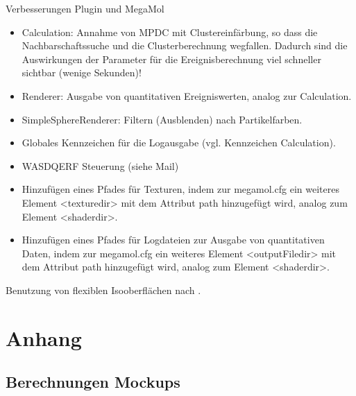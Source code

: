 Verbesserungen Plugin und MegaMol
\begin{itemize}
	\item Calculation: Annahme von MPDC mit Clustereinfärbung, so dass die Nachbarschaftssuche und die Clusterberechnung wegfallen. Dadurch sind die Auswirkungen der Parameter für die Ereignisberechnung viel schneller sichtbar (wenige Sekunden)!
	\item Renderer: Ausgabe von quantitativen Ereigniswerten, analog zur Calculation.
	\item SimpleSphereRenderer: Filtern (Ausblenden) nach Partikelfarben.
	\item Globales Kennzeichen für die Logausgabe (vgl. Kennzeichen Calculation).
	\item WASDQERF Steuerung (siehe Mail)
	\item Hinzufügen eines Pfades für Texturen, indem zur megamol.cfg ein weiteres Element <texturedir> mit dem Attribut path hinzugefügt wird, analog zum Element <shaderdir>.
	\item Hinzufügen eines Pfades für Logdateien zur Ausgabe von quantitativen Daten, indem zur megamol.cfg ein weiteres Element <outputFiledir> mit dem Attribut path hinzugefügt wird, analog zum Element <shaderdir>.
\end{itemize}

Benutzung von flexiblen Isooberflächen nach \cite{carr2010flexibleIsosurfaces}.



\appendix

\chapter{Anhang}

\section{Berechnungen Mockups}\label{sec:mockups:berechnungen}

